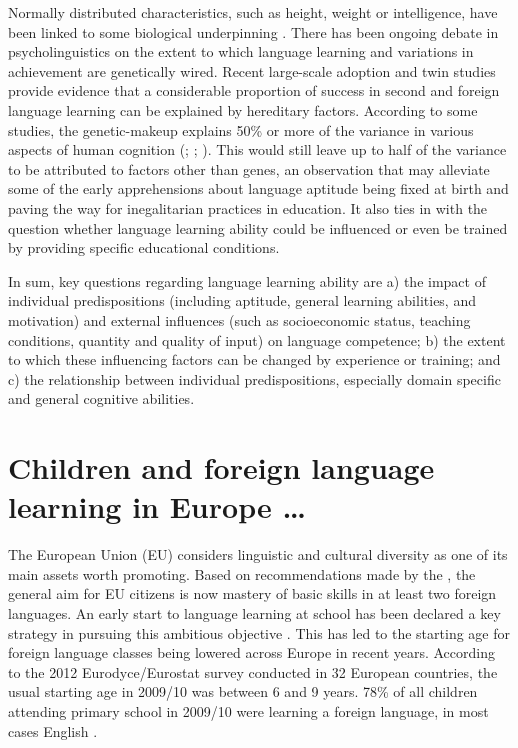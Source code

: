 \documentclass[output=paper]{langsci/langscibook}
\begin{document}
Normally distributed characteristics, such as height, weight or intelligence, have been linked to some biological underpinning \citep{Reiterer2019}. There has been ongoing debate in psycholinguistics on the extent to which language learning and variations in achievement are genetically wired. Recent large-scale adoption and twin studies provide evidence that a considerable proportion of success in second and foreign language learning can be explained by hereditary factors. According to some studies, the genetic-makeup explains 50\% or more of the variance in various aspects of human cognition (\citealt{DaleEtAl2010}; \citealt{Stromswold2001}; \citealt{RimfeldEtAl2015}). This would still leave up to half of the variance to be attributed to factors other than genes, an observation that may alleviate some of the early apprehensions about language aptitude being fixed at birth and paving the way for inegalitarian practices in education. It also ties in with the question whether language learning ability could be influenced or even be trained by providing specific educational conditions. 

In sum, key questions regarding language learning ability are a) the impact of individual predispositions (including aptitude, general learning abilities, and motivation) and external influences (such as socioeconomic status, teaching conditions, quantity and quality of input) on language competence; b) the extent to which these influencing factors can be changed by experience or training; and c) the relationship between individual predispositions, especially domain specific and general cognitive abilities.  

\section{Children and foreign language learning in Europe …}

The European Union (EU) considers linguistic and cultural diversity as one of its main assets worth promoting. Based on recommendations made by the \citet[19]{BarcelonaEuropeanCouncil2002}, the general aim for EU citizens is now mastery of basic skills in at least two foreign languages. An early start to language learning at school has been declared a key strategy in pursuing this ambitious objective \citep{EuropeanCommission2004}. This has led to the starting age for foreign language classes being lowered across Europe in recent years. According to the 2012 Eurodyce\slash Eurostat survey conducted in 32 European countries, the usual starting age in 2009/10 was between 6 and 9 years. 78\% of all children attending primary school in 2009/10 were learning a foreign language, in most cases English \citep[10f]{Eurostat2012}.
\end{document}
